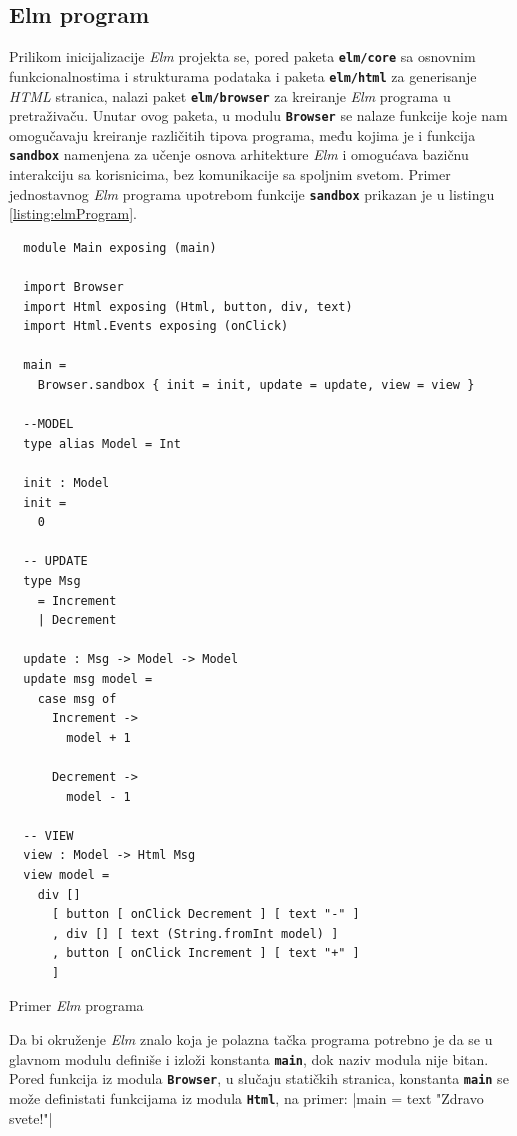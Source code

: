 \documentclass[12pt,oneside]{memoir}
\begin{document}
\subsection{Elm program}
Prilikom inicijalizacije \emph{Elm} projekta se, pored paketa \texttt{\textbf{elm/core}} sa
osnovnim funkcionalnostima i strukturama podataka i paketa \texttt{\textbf{elm/html}} za
generisanje \emph{HTML} stranica, nalazi paket \texttt{\textbf{elm/browser}} za kreiranje \emph{Elm}
programa u pretraživaču. Unutar ovog paketa, u modulu \texttt{\textbf{Browser}} se nalaze
funkcije koje nam omogučavaju kreiranje različitih tipova programa, među kojima je i
funkcija \texttt{\textbf{sandbox}} namenjena za učenje osnova arhitekture \emph{Elm} i
omogućava bazičnu interakciju sa korisnicima, bez komunikacije sa spoljnim svetom.
Primer jednostavnog \emph{Elm} programa upotrebom funkcije \texttt{\textbf{sandbox}} prikazan
je u listingu \ref{listing:elmProgram}.
\begin{listing}[h!]
\begin{verbatim}
  module Main exposing (main)

  import Browser
  import Html exposing (Html, button, div, text)
  import Html.Events exposing (onClick)
  
  main =
    Browser.sandbox { init = init, update = update, view = view }

  --MODEL
  type alias Model = Int
  
  init : Model
  init =
    0
  
  -- UPDATE
  type Msg
    = Increment
    | Decrement
  
  update : Msg -> Model -> Model
  update msg model =
    case msg of
      Increment ->
        model + 1
  
      Decrement ->
        model - 1
  
  -- VIEW
  view : Model -> Html Msg
  view model =
    div []
      [ button [ onClick Decrement ] [ text "-" ]
      , div [] [ text (String.fromInt model) ]
      , button [ onClick Increment ] [ text "+" ]
      ]
\end{verbatim}
\caption{Primer \emph{Elm} programa}
\label{listing:elmProgram}
\end{listing}

Da bi okruženje \emph{Elm} znalo koja je polazna tačka programa potrebno je da se u glavnom
modulu definiše i izloži konstanta \textbf{\texttt{main}}, dok naziv modula nije bitan.
Pored funkcija iz modula \texttt{\textbf{Browser}}, u slučaju statičkih stranica, konstanta 
\textbf{\texttt{main}} se može definistati funkcijama iz modula \texttt{\textbf{Html}},
na primer: |main = text "Zdravo svete!"|
\end{document}
